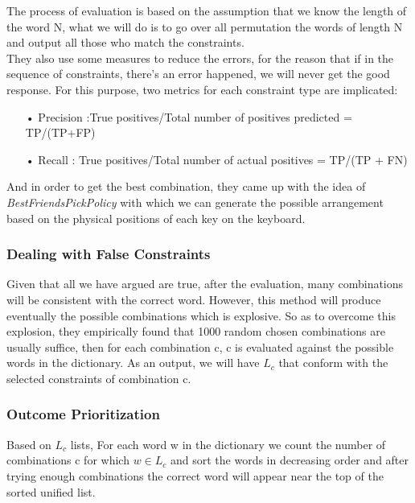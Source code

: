 \documentclass[12pt,a4paper]{article}
\begin{document}
The process of evaluation is based on the assumption that we know the length of the word N,  what we will do is to go over all permutation the words of length N and output all those who match the constraints.\\

They also use some measures to reduce the errors, for the reason that if in the sequence of constraints, there's an error happened, we will never get the good response. For this purpose, two metrics for each constraint type are implicated:\\
 
\begin{itemize}
\item[•] Precision :True positives/Total number of positives predicted  =  TP/(TP+FP)
\item[•] Recall :  True positives/Total number of actual positives = TP/(TP + FN)\\
\end{itemize}

And in order to get the best combination, they came up with the idea of \textit{BestFriendsPickPolicy} with which we can generate the possible arrangement based on the physical positions of each key on the keyboard.\\

 \subsubsection{Dealing with False Constraints}
 
Given that all we have argued are true, after the evaluation, many combinations will be consistent with the correct word. However, this method will produce eventually the possible combinations which is explosive.  So as to overcome this explosion, they empirically found that 1000 random chosen combinations are usually suffice, then for each combination c, c is evaluated against the possible words in the dictionary. As an output, we will have $L_{c}$ that conform with the selected constraints of combination c.\\

\subsubsection{Outcome Prioritization}

Based on $L_{c}$ lists, For each word w in the dictionary we count the number of combinations c for which $w \in L_{c}$ and sort the words in decreasing order and after trying enough combinations the correct word will appear near the top of the sorted unified list.  \\
\end{document}
